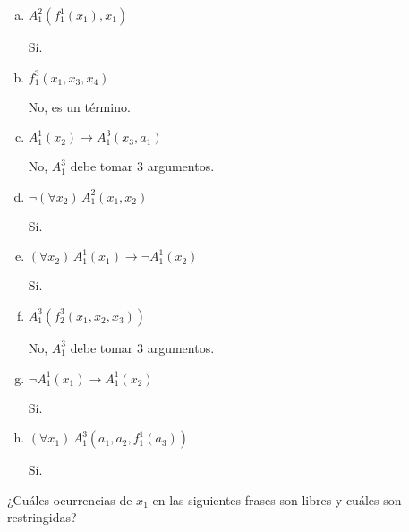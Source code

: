 \begin{enumerate}[(a)]
    \item $A_1^2(f_1^1(x_1), x_1)$
    \begin{solution}
    Sí.
    \end{solution}
    
    \item $f_1^3(x_1, x_3, x_4)$
    \begin{solution}
    No, es un término.
    \end{solution}
    
    \item $A_1^1(x_2) \to A_1^3(x_3, a_1)$
    \begin{solution}
    No, $A_1^3$ debe tomar 3 argumentos.
    \end{solution}

    \item $\neg (\forall x_2) \, A_1^2(x_1, x_2)$
    \begin{solution}
    Sí.
    \end{solution}

    \item $(\forall x_2) \, A_1^1(x_1) \to \neg A_1^1(x_2)$
    \begin{solution}
    Sí.
    \end{solution}

    \item $A_1^3(f_2^3(x_1, x_2, x_3))$
    \begin{solution}
    No, $A_1^3$ debe tomar 3 argumentos.
    \end{solution}

    \item $\neg A_1^1(x_1) \to A_1^1(x_2)$
    \begin{solution}
    Sí.
    \end{solution}

    \item $(\forall x_1) \, A_1^3(a_1, a_2, f_1^1(a_3))$
    \begin{solution}
    Sí.
    \end{solution}
\end{enumerate}

\begin{exercise}
¿Cuáles ocurrencias de $x_1$ en las siguientes frases son libres y cuáles son restringidas?
\end{exercise}

